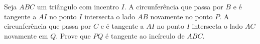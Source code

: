 Seja $ABC$ um triângulo com incentro $I$. A circunferência que passa por $B$ e é tangente a $AI$ no ponto $I$ intersecta o lado $AB$ novamente no ponto $P$. A circunferência que passa por $C$ e é tangente a $AI$ no ponto $I$ intersecta o lado $AC$ novamente em $Q$. Prove que $PQ$ é tangente ao incírculo de $ABC$.
